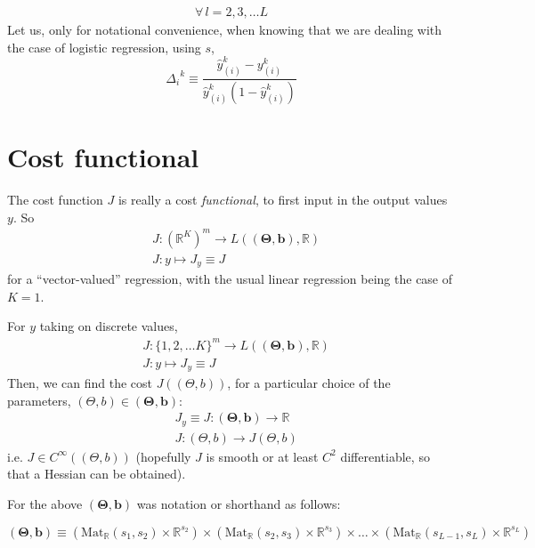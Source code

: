 \documentclass[10pt]{amsart}
\begin{document}
\begin{multicols*}{2}
\[\begin{gathered}
\forall \, l = 2,3, \dots L
\end{gathered}\]
Let us, only for notational convenience, when knowing that we are dealing with the case of logistic regression, using $s$, 
\[
\Delta_i^{\  \  k } \equiv \frac{\widehat{y}_{(i)}^k - y_{(i)}^k }{ \widehat{y}_{(i)}^k (1 - \widehat{y}_{(i)}^k )}
\]




\section{Cost functional}

The cost function $J$ is really a cost \emph{functional}, to first input in the output values $y$.  So
\begin{equation}
\begin{aligned}
  &  J: (\mathbb{R}^K)^m \to L(\mathbf{ (\Theta, b) }, \mathbb{R} ) \\ 
& J: y \mapsto J_y \equiv J 
\end{aligned}
\end{equation}
for a ``vector-valued'' regression, with the usual linear regression being the case of $K=1$.

For $y$ taking on discrete values,
\begin{equation}
\begin{aligned}
  & J: \lbrace 1, 2, \dots K \rbrace^m \to L( \mathbf{ (\Theta ,b) } , \mathbb{R} ) \\ 
  & J: y \mapsto J_y \equiv J 
  \end{aligned}
  \end{equation}
Then, we can find the cost $J((\Theta, b))$, for a particular choice of the parameters, $(\Theta,b) \in \mathbf{ (\Theta,b)}$:
\begin{equation}
\begin{aligned}
 &  J_y \equiv J : \mathbf{ ( \Theta,b) } \to \mathbb{R} \\ 
 & J: (\Theta,b) \to J(\Theta,b)
  \end{aligned}
  \end{equation}
i.e. $J \in C^{\infty}((\Theta,b))$ (hopefully $J$ is smooth or at least $C^2$ differentiable, so that a Hessian can be obtained).


For the above $\mathbf{ (\Theta,b)}$ was notation or shorthand as follows:

\[
\mathbf{ (\Theta,b ) } \equiv (\text{Mat}_{\mathbb{R}}(s_1,s_2) \times \mathbb{R}^{s_2}) \times (\text{Mat}_{\mathbb{R}}(s_2,s_3) \times \mathbb{R}^{s_3} ) \times \dots \times (\text{Mat}_{\mathbb{R}}(s_{L-1},s_L) \times \mathbb{R}^{s_L} )
\]


\end{multicols*}
\end{document}
